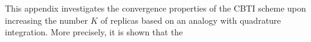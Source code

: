 This appendix investigates the convergence properties of the CBTI scheme upon
increasing the number $K$ of replicas based on an analogy with quadrature integration. More precisely, it is  shown that the 
